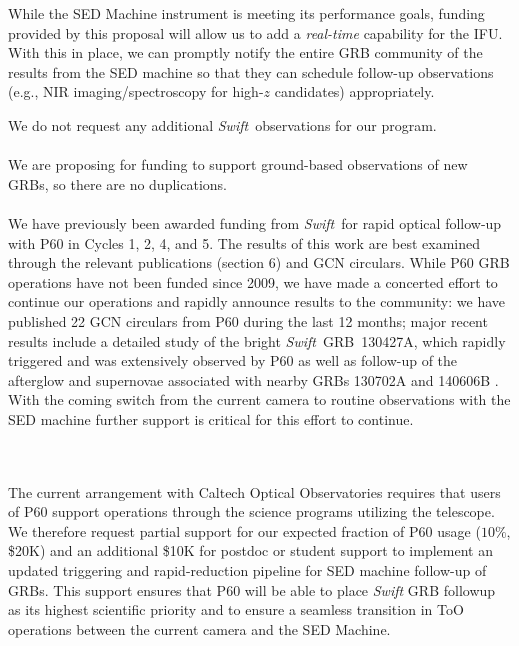 \documentclass[letterpaper,11pt]{article}
\newcommand{\swift}{\textit{Swift}}
\begin{document}
While the SED Machine instrument is meeting its performance goals, funding 
provided by this proposal will allow us to add a \textit{real-time} capability for the IFU.  With this in place,
we can promptly notify the entire GRB community of the results from the
SED machine so that they can schedule follow-up observations (e.g.,
NIR imaging/spectroscopy for high-$z$ candidates) appropriately.

We do not request any additional \swift\ observations for our program. \\

\smallskip\\
We are proposing for funding to support ground-based observations of new GRBs, so 
there are no duplications.\\

\smallskip\\
We have previously been awarded funding from \swift\ for rapid optical
follow-up with P60 in Cycles 1, 2, 4, and 5.  The results of this work are best
examined through the relevant publications (section 6) and GCN circulars.  
While P60 GRB operations have not been funded since 2009, we have made a 
concerted effort to continue our operations and rapidly announce results
to the community: we have published 22 GCN circulars from P60 during the last 
12 months; 
major recent results include a detailed study of the bright 
\swift\ GRB\ 130427A, which rapidly triggered and was extensively observed by 
P60  \citep{pcc+2013} as well as follow-up of the afterglow
and supernovae associated with nearby GRBs 130702A \citep{sck+13,tcs+15} and 
140606B \citep{skc+15,cdp+15}.  
With the coming switch from the current camera to routine observations with 
the SED machine further support is critical for this effort to continue.
\\


\smallskip\\
\begin{multicols}{2}
{\footnotesize


}
\end{multicols}

\smallskip\\
The current arrangement with Caltech Optical Observatories requires that
users of P60 support operations through the science programs
utilizing the telescope. We therefore request partial support for
our expected fraction of P60 usage ($10\%$, \$20K) and an additional \$10K 
for postdoc or student support to implement an updated triggering and rapid-reduction
pipeline for SED machine follow-up of GRBs.
This support ensures
that P60 will be able to place {\em Swift} GRB followup as its
highest scientific priority and to ensure a seamless transition in ToO operations
between the current camera and the SED Machine.
\end{document}
